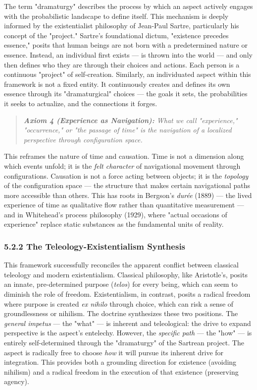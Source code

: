 The term "dramaturgy" describes the process by which an aspect actively engages with the probabilistic landscape to define itself. This mechanism is deeply informed by the existentialist philosophy of Jean-Paul Sartre, particularly his concept of the "project." Sartre's foundational dictum, "existence precedes essence," posits that human beings are not born with a predetermined nature or essence. Instead, an individual first exists — is thrown into the world — and only then defines who they are through their choices and actions. Each person is a continuous "project" of self-creation. Similarly, an individuated aspect within this framework is not a fixed entity. It continuously creates and defines its own essence through its "dramaturgical" choices — the goals it sets, the probabilities it seeks to actualize, and the connections it forges.


\begin{quote}
\itshape
\textbf{Axiom 4 (Experience as Navigation):} \textit{What we call "experience," "occurrence," or "the passage of time" is the navigation of a localized perspective through configuration space.}
\end{quote}


This reframes the nature of time and causation. Time is not a dimension along which events unfold; it is the \textit{felt character} of navigational movement through configurations. Causation is not a force acting between objects; it is the \textit{topology} of the configuration space — the structure that makes certain navigational paths more accessible than others. This has roots in Bergson's \textit{durée} (1889) — the lived experience of time as qualitative flow rather than quantitative measurement — and in Whitehead's process philosophy (1929), where "actual occasions of experience" replace static substances as the fundamental units of reality.


\subsubsection*{5.2.2 The Teleology-Existentialism Synthesis}


This framework successfully reconciles the apparent conflict between classical teleology and modern existentialism. Classical philosophy, like Aristotle's, posits an innate, pre-determined purpose (\textit{telos}) for every being, which can seem to diminish the role of freedom. Existentialism, in contrast, posits a radical freedom where purpose is created \textit{ex nihilo} through choice, which can risk a sense of groundlessness or nihilism. The doctrine synthesizes these two positions. The \textit{general impetus} — the "what" — is inherent and teleological: the drive to expand perspective is the aspect's entelechy. However, the \textit{specific path} — the "how" — is entirely self-determined through the "dramaturgy" of the Sartrean project. The aspect is radically free to choose \textit{how} it will pursue its inherent drive for integration. This provides both a grounding direction for existence (avoiding nihilism) and a radical freedom in the execution of that existence (preserving agency).


